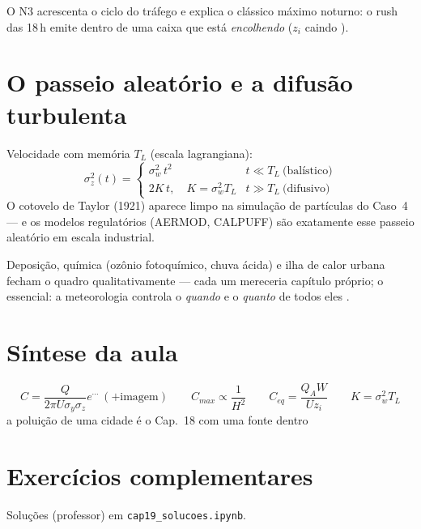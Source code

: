 \documentclass[11pt]{article}
\begin{document}
O N3 acrescenta o ciclo do tráfego e explica o clássico máximo
noturno: o rush das 18\,h emite dentro de uma caixa que está
\emph{encolhendo} ($z_i$ caindo ).

\section{O passeio aleatório e a difusão turbulenta}\label{sec:walk}


\begin{formadif}
Velocidade com memória $T_L$ (escala lagrangiana):
\[ \sigma_z^2(t) =
\begin{cases}
\sigma_w^2\,t^2 & t \ll T_L\ \text{(balístico)}\\
2K\,t,\quad K = \sigma_w^2T_L & t \gg T_L\ \text{(difusivo)}
\end{cases} \]
O cotovelo de Taylor (1921) aparece limpo na simulação de partículas
do Caso~4 — e os modelos regulatórios (AERMOD, CALPUFF) são
exatamente esse passeio aleatório em escala industrial.
\end{formadif}

Deposição, química (ozônio fotoquímico, chuva ácida) e ilha de calor
urbana fecham o quadro qualitativamente — cada um mereceria capítulo
próprio; o essencial: a meteorologia controla o \emph{quando} e o
\emph{quanto} de todos eles .

\section{Síntese da aula}

\begin{noquadro}
\[ C = \frac{Q}{2\pi U\sigma_y\sigma_z}e^{\cdots}\ (+\text{imagem})
\qquad C_{max} \propto \frac{1}{H^2} \qquad
C_{eq} = \frac{Q_AW}{Uz_i} \qquad K = \sigma_w^2T_L \]
a poluição de uma cidade é o Cap.~18 com uma fonte dentro
\end{noquadro}

\section{Exercícios complementares}\label{sec:exercicios}

Soluções (professor) em \texttt{cap19\_solucoes.ipynb}.
\end{document}
